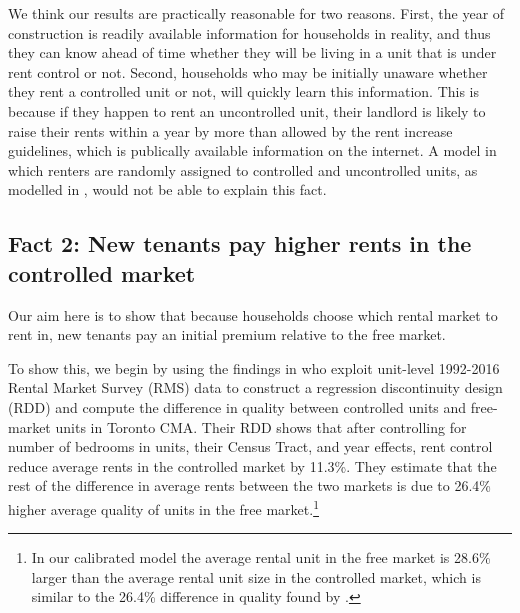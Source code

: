 \documentclass[parskip=full]{article}
\begin{document}
We think our results are practically reasonable for two reasons. First, the year of construction is readily available information for households in reality, and thus they can know ahead of time whether they will be living in a unit that is under rent control or not. Second, households who may be initially unaware whether they rent a controlled unit or not, will quickly learn this information. This is because if they happen to rent an uncontrolled unit, their landlord is likely to raise their rents within a year by more than allowed by the rent increase guidelines, which is publically available information on the internet. A model in which renters are randomly assigned to controlled and uncontrolled units, as modelled in \citet{fmn-2022}, would not be able to explain this fact. 

\subsection{Fact 2: New tenants pay higher rents in the controlled market}\label{sec:rent_premium} 

Our aim here is to show that because households choose which rental market to rent in, new tenants pay an initial premium relative to the free market. 

To show this, we begin by using the findings in \citet{zhang-gou} who exploit unit-level 1992-2016 Rental Market Survey (RMS) data to construct a regression discontinuity design (RDD) and compute the difference in quality between controlled units and free-market units in Toronto CMA. Their RDD shows that after controlling for number of bedrooms in units, their Census Tract, and year effects, rent control reduce average rents in the controlled market by 11.3\%. They estimate that the rest of the difference in average rents between the two markets is due to 26.4\% higher average quality of units in the free market.\footnote{In our calibrated model the average rental unit in the free market is 28.6\% larger than the average rental unit size in the controlled market, which is similar to the 26.4\% difference in quality found by \citet{zhang-gou}.} 
\end{document}
